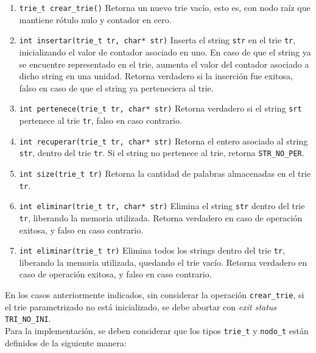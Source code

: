\documentclass[12pt,a4paper]{article}
\begin{document}
\begin{enumerate}
	
	\item \texttt{trie\_t crear\_trie()} Retorna un nuevo trie vacío, esto es, con nodo raíz que mantiene rótulo nulo y contador en cero.
	
	\item \texttt{int insertar(trie\_t tr, char* str)} Inserta el string \texttt{str} en el trie \texttt{tr}, inicializando el valor de contador asociado en uno. En caso de que el string ya se encuentre representado en el trie, aumenta el valor del contador asociado a dicho string en una unidad. Retorna verdadero si la inserción fue exitosa, falso en caso de que el string ya perteneciera al trie.

	\item \texttt{int pertenece(trie\_t tr, char* str)} Retorna verdadero si el string \texttt{srt} pertenece al trie \texttt{tr}, falso en caso contrario.
	
	\item \texttt{int recuperar(trie\_t tr, char* str)} Retorna el entero asociado al string \texttt{str}, dentro del trie \texttt{tr}. Si el string no pertenece al trie, retorna \texttt{STR\_NO\_PER}.

	\item \texttt{int size(trie\_t tr)} Retorna la cantidad de palabras almacenadas en el trie \texttt{tr}.
	
	\item \texttt{int eliminar(trie\_t tr, char* str)} Elimina el string \texttt{str} dentro del trie \texttt{tr}, liberando la memoria utilizada. Retorna verdadero en caso de operación exitosa, y falso en caso contrario.
		
	\item \texttt{int eliminar(trie\_t tr)} Elimina todos los strings dentro del trie \texttt{tr}, liberando la memoria utilizada, quedando el trie vacío. Retorna verdadero en caso de operación exitosa, y falso en caso contrario.
	
\end{enumerate}

En los casos anteriormente indicados, sin considerar la operación \texttt{crear\_trie}, si el trie parametrizado no está inicializado, se debe abortar con \emph{exit status} \texttt{TRI\_NO\_INI}. \\

Para la implementación, se deben considerar que los tipos \texttt{trie\_t} y \texttt{nodo\_t} están definidos de la siguiente manera:
\end{document}
